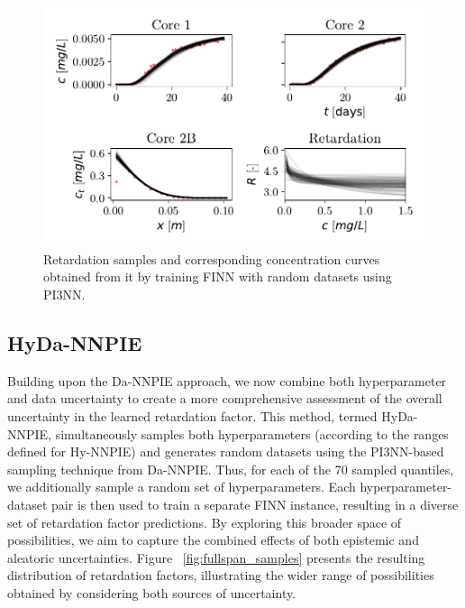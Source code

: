 \begin{figure}[h]
    \centering
    \includegraphics{figs/finn_dataspan_samples.pdf}
    \caption{Retardation samples and corresponding concentration curves obtained from it by training FINN with random datasets using PI3NN.}
    \label{fig:dataspan_samples}
\end{figure}



\subsection{HyDa-NNPIE}
Building upon the Da-NNPIE approach, we now combine both hyperparameter and data uncertainty to create a more comprehensive assessment of the overall uncertainty in the learned retardation factor. This method, termed HyDa-NNPIE, simultaneously samples both hyperparameters (according to the ranges defined for Hy-NNPIE) and generates random datasets using the PI3NN-based sampling technique from Da-NNPIE. Thus, for each of the 70 sampled quantiles, we additionally sample a random set of hyperparameters. Each hyperparameter-dataset pair is then used to train a separate FINN instance, resulting in a diverse set of retardation factor predictions. By exploring this broader space of possibilities, we aim to capture the combined effects of both epistemic and aleatoric uncertainties. Figure ~\vref{fig:fullspan_samples} presents the resulting distribution of retardation factors, illustrating the wider range of possibilities obtained by considering both sources of uncertainty.

